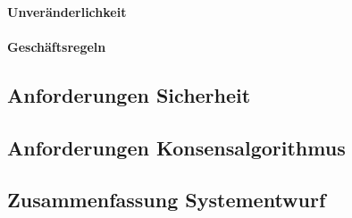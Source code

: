 \paragraph{Unveränderlichkeit}

\paragraph{Geschäftsregeln}

\subsection{Anforderungen Sicherheit}

\subsection{Anforderungen Konsensalgorithmus}

\subsection{Zusammenfassung Systementwurf}

\newpage
